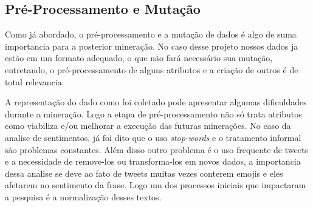 \subsection{Pré-Processamento e Mutação}
Como já abordado, o pré-processamento e a mutação de dados é algo de suma importancia para a posterior mineração. No caso desse projeto nossos dados ja estão em um formato adequado, o que não fará necessário sua mutação, entretando, o pré-processamento de alguns atributos e a criação de outros é de total relevancia.

A representação do dado como foi coletado pode apresentar algumas dificuldades durante a mineração. Logo a etapa de pré-processamento não só trata atributos como viabiliza e/ou melhorar a execução das futuras minerações. No caso da analise de sentimentos, já foi dito que o uso \textit{stop-words} e o tratamento informal são problemas constantes. Além disso outro problema é o uso frequente de tweets e a necessidade de remove-los ou transforma-los em novos dados, a importancia dessa analise se deve ao fato de tweets muitas vezes conterem emojis e eles afetarem no sentimento da frase\cite{novak2015sentiment}. Logo um dos processos iniciais que impactaram a pesquisa é a normalização desses textos.

